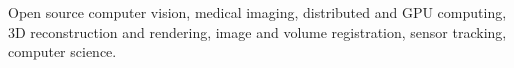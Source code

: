




Open source computer vision, medical imaging, distributed and GPU computing, 3D reconstruction and rendering, image and volume registration, sensor tracking, computer science.


